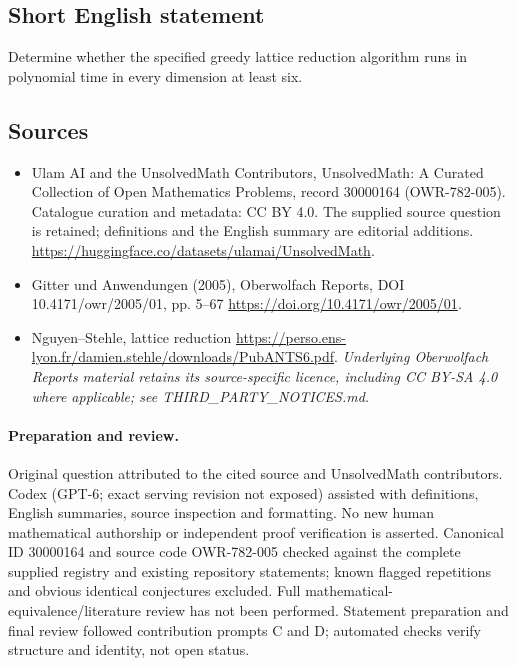 \documentclass[11pt]{article}
\begin{document}
\subsection{Short English statement}
Determine whether the specified greedy lattice reduction algorithm runs in polynomial time in every dimension at least six.
\subsection{Sources}
\begin{itemize}
\item[\hypertarget{source:30000164:1}{S1}] Ulam AI and the UnsolvedMath Contributors, UnsolvedMath: A Curated Collection of Open Mathematics Problems, record 30000164 (OWR-782-005). Catalogue curation and metadata: CC BY 4.0. The supplied source question is retained; definitions and the English summary are editorial additions.
\url{https://huggingface.co/datasets/ulamai/UnsolvedMath}.
\item[\hypertarget{source:30000164:2}{S2}] Gitter und Anwendungen (2005), Oberwolfach Reports, DOI 10.4171/owr/2005/01, pp. 5--67
\url{https://doi.org/10.4171/owr/2005/01}.
\item[\hypertarget{source:30000164:3}{S3}] Nguyen--Stehle, lattice reduction
\url{https://perso.ens-lyon.fr/damien.stehle/downloads/PubANTS6.pdf}.
\textit{Underlying Oberwolfach Reports material retains its source-specific licence, including CC BY-SA 4.0 where applicable; see THIRD\_PARTY\_NOTICES.md.}
\end{itemize}
\paragraph{Preparation and review.}
Original question attributed to the cited source and UnsolvedMath contributors. Codex (GPT-6; exact serving revision not exposed) assisted with definitions, English summaries, source inspection and formatting. No new human mathematical authorship or independent proof verification is asserted. Canonical ID 30000164 and source code OWR-782-005 checked against the complete supplied registry and existing repository statements; known flagged repetitions and obvious identical conjectures excluded. Full mathematical-equivalence/literature review has not been performed. Statement preparation and final review followed contribution prompts C and D; automated checks verify structure and identity, not open status.
\label{end:30000164}
\end{document}
